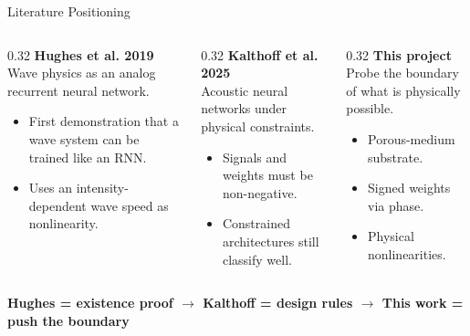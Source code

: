\documentclass[aspectratio=169,11pt]{beamer}
\begin{document}
\begin{frame}{Literature Positioning}
  \begin{columns}[T]
    \begin{column}{0.32\textwidth}
      \textbf{Hughes et al. 2019}\\[0.1cm]
      \footnotesize
      Wave physics as an analog recurrent neural network.
      \begin{itemize}
        \item First demonstration that a wave system can be trained like an RNN.
        \item Uses an intensity-dependent wave speed as nonlinearity.
      \end{itemize}
    \end{column}
    \begin{column}{0.32\textwidth}
      \textbf{Kalthoff et al. 2025}\\[0.1cm]
      \footnotesize
      Acoustic neural networks under physical constraints.
      \begin{itemize}
        \item Signals and weights must be non-negative.
        \item Constrained architectures still classify well.
      \end{itemize}
    \end{column}
    \begin{column}{0.32\textwidth}
      \textbf{This project}\\[0.1cm]
      \footnotesize
      Probe the boundary of what is physically possible.
      \begin{itemize}
        \item Porous-medium substrate.
        \item Signed weights via phase.
        \item Physical nonlinearities.
      \end{itemize}
    \end{column}
  \end{columns}

  \vspace{0.4cm}
  \begin{center}
    \textcolor{gdpDarkBlue}{\textbf{Hughes = existence proof \quad $\rightarrow$ \quad Kalthoff = design rules \quad $\rightarrow$ \quad This work = push the boundary}}
  \end{center}
\end{frame}
\end{document}
